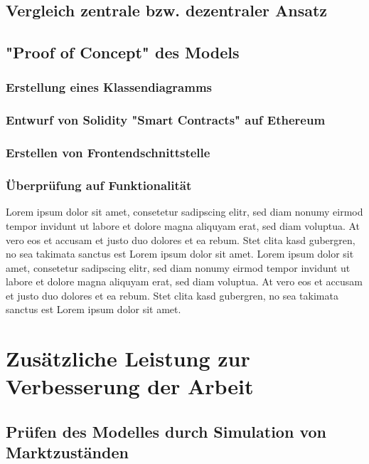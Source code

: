 \documentclass[a4paper, 10pt]{scrartcl}
\begin{document}

\subsection{Vergleich zentrale bzw. dezentraler Ansatz}

\subsection{"Proof of Concept" des Models}
\subsubsection{Erstellung eines Klassendiagramms}
\subsubsection{Entwurf von Solidity "Smart Contracts" auf Ethereum}
\subsubsection{Erstellen von Frontendschnittstelle}
\subsubsection{Überprüfung auf Funktionalität}
Lorem ipsum dolor sit amet, consetetur sadipscing elitr, sed diam nonumy eirmod tempor invidunt ut labore et dolore magna aliquyam erat, sed diam voluptua. At vero eos et accusam et justo duo dolores et ea rebum. Stet clita kasd gubergren, no sea takimata sanctus est Lorem ipsum dolor sit amet. Lorem ipsum dolor sit amet, consetetur sadipscing elitr, sed diam nonumy eirmod tempor invidunt ut labore et dolore magna aliquyam erat, sed diam voluptua. At vero eos et accusam et justo duo dolores et ea rebum. Stet clita kasd gubergren, no sea takimata sanctus est Lorem ipsum dolor sit amet.
\section{Zusätzliche Leistung zur Verbesserung der Arbeit}
\subsection{Prüfen des Modelles durch Simulation von Marktzuständen}
\end{document}
